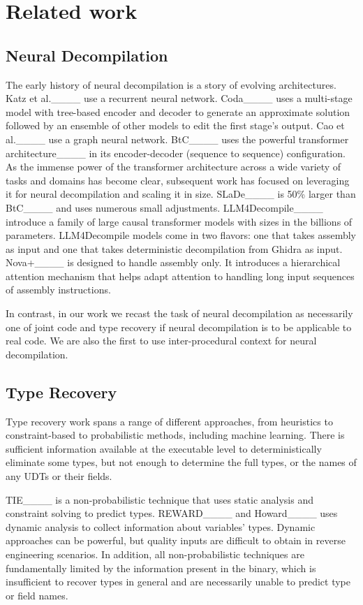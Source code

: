 \section{Related work}
\subsection{Neural Decompilation}

The early history of neural decompilation is a story of evolving architectures.
Katz et al.____ use a recurrent neural network.
Coda____ uses a multi-stage model with tree-based encoder and decoder to generate an approximate solution followed by an ensemble of other models to edit the first stage's output.
Cao et al.____ use a graph neural network.
BtC____ uses the powerful transformer architecture____ in its encoder-decoder (sequence to sequence) configuration.
As the immense power of the transformer architecture across a wide variety of tasks and domains has become clear, subsequent work has focused on leveraging it for neural decompilation and scaling it in size.
SLaDe____ is 50\% larger than BtC____ and uses numerous small adjustments.
LLM4Decompile____ introduce a family of large causal transformer models with sizes in the billions of parameters.
LLM4Decompile models come in two flavors: one that takes assembly as input and one that takes deterministic decompilation from Ghidra as input.
Nova+____ is designed to handle assembly only.
It introduces a hierarchical attention mechanism that helps adapt attention to handling long input sequences of assembly instructions.

In contrast, in our work we recast the task of neural decompilation as necessarily one of joint code and type recovery if neural decompilation is to be applicable to real code.
We are also the first to use inter-procedural context for neural decompilation.

\subsection{Type Recovery}

Type recovery work spans a range of different approaches, from heuristics to constraint-based to probabilistic methods, including machine learning.
There is sufficient information available at the executable level to deterministically eliminate some types, but not enough to determine the full types, or the names of any UDTs or their fields.

TIE____ is a non-probabilistic technique that uses static analysis and constraint solving to predict types.
REWARD____ and Howard____ uses dynamic analysis to collect information about variables' types.
Dynamic approaches can be powerful, but quality inputs are difficult to obtain in reverse engineering scenarios.
In addition, all non-probabilistic techniques are fundamentally limited by the information present in the binary, which is insufficient to recover types in general and are necessarily unable to predict type or field names.

